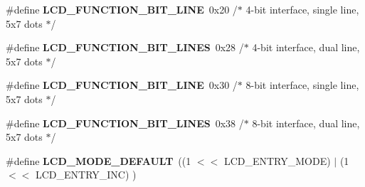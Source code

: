 \begin{DoxyCompactItemize}
\item 
\mbox{\label{group__pfleury__lcd_gaff4e5baa36a0322eb97557dcb18cd96e}} 
\#define {\bfseries L\+C\+D\+\_\+\+F\+U\+N\+C\+T\+I\+O\+N\+\_\+B\+I\+T\+\_\+L\+I\+NE}~0x20 /$\ast$ 4-\/bit interface, single line, 5x7 dots $\ast$/
\item 
\mbox{\label{group__pfleury__lcd_gab35032ab368a8bc90798e0c547fb24c2}} 
\#define {\bfseries L\+C\+D\+\_\+\+F\+U\+N\+C\+T\+I\+O\+N\+\_\+B\+I\+T\+\_\+L\+I\+N\+ES}~0x28 /$\ast$ 4-\/bit interface, dual line,   5x7 dots $\ast$/
\item 
\mbox{\label{group__pfleury__lcd_gaa8aeee098cb4c84ec420e00d054abcce}} 
\#define {\bfseries L\+C\+D\+\_\+\+F\+U\+N\+C\+T\+I\+O\+N\+\_\+B\+I\+T\+\_\+L\+I\+NE}~0x30 /$\ast$ 8-\/bit interface, single line, 5x7 dots $\ast$/
\item 
\mbox{\label{group__pfleury__lcd_ga160a214f47869f8f98ad5add3a7568db}} 
\#define {\bfseries L\+C\+D\+\_\+\+F\+U\+N\+C\+T\+I\+O\+N\+\_\+B\+I\+T\+\_\+L\+I\+N\+ES}~0x38 /$\ast$ 8-\/bit interface, dual line,   5x7 dots $\ast$/
\item 
\mbox{\label{group__pfleury__lcd_ga1849e2087d3034a3fffa67444beed109}} 
\#define {\bfseries L\+C\+D\+\_\+\+M\+O\+D\+E\+\_\+\+D\+E\+F\+A\+U\+LT}~((1 $<$$<$ L\+C\+D\+\_\+\+E\+N\+T\+R\+Y\+\_\+\+M\+O\+DE) $\vert$ (1 $<$$<$ L\+C\+D\+\_\+\+E\+N\+T\+R\+Y\+\_\+\+I\+NC) )
\end{DoxyCompactItemize}
